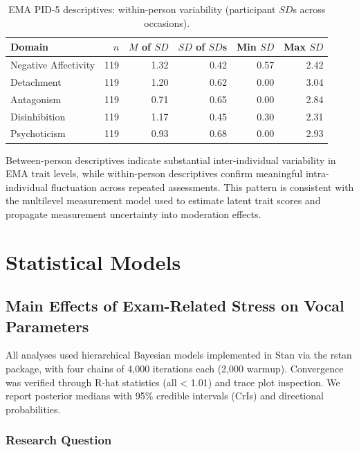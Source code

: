 \documentclass[
  english,
  man,floatsintext]{apa6}
\begin{document}
\begin{table}

\caption{\label{tab:table-s7-ema-within}EMA PID-5 descriptives: within-person variability (participant $SD$s across occasions).}
\centering
\begin{tabular}[t]{lrrrrr}
\toprule
Domain & $n$ & $M$ of $SD$ & $SD$ of $SD$s & Min $SD$ & Max $SD$\\
\midrule
Negative Affectivity & 119 & 1.32 & 0.42 & 0.57 & 2.42\\
Detachment & 119 & 1.20 & 0.62 & 0.00 & 3.04\\
Antagonism & 119 & 0.71 & 0.65 & 0.00 & 2.84\\
Disinhibition & 119 & 1.17 & 0.45 & 0.30 & 2.31\\
Psychoticism & 119 & 0.93 & 0.68 & 0.00 & 2.93\\
\bottomrule
\end{tabular}
\end{table}

Between-person descriptives indicate substantial inter-individual variability in EMA trait levels, while within-person descriptives confirm meaningful intra-individual fluctuation across repeated assessments. This pattern is consistent with the multilevel measurement model used to estimate latent trait scores and propagate measurement uncertainty into moderation effects.

\newpage

\section{Statistical Models}\label{statistical-models}

\subsection{Main Effects of Exam-Related Stress on Vocal Parameters}\label{main-effects-of-exam-related-stress-on-vocal-parameters}

All analyses used hierarchical Bayesian models implemented in Stan via the rstan package, with four chains of 4,000 iterations each (2,000 warmup). Convergence was verified through R-hat statistics (all \textless{} 1.01) and trace plot inspection. We report posterior medians with 95\% credible intervals (CrIs) and directional probabilities.

\subsubsection{Research Question}\label{research-question}
\end{document}
